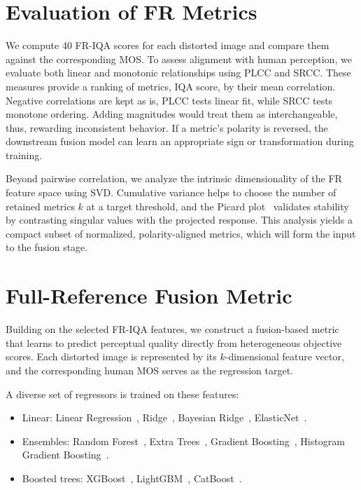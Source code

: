\section{Evaluation of \acl{FR} Metrics}

We compute 40 \acs{FR-IQA} scores for each distorted image and compare them against the corresponding \acs{MOS}. To assess alignment with human perception, we evaluate both linear and monotonic relationships using \acs{PLCC} and \acs{SRCC}. These measures provide a ranking of metrics, IQA score, by their mean correlation. Negative correlations are kept as is, \acs{PLCC} tests linear fit, while \acs{SRCC} tests monotone ordering. Adding magnitudes would treat them as interchangeable, thus, rewarding inconsistent behavior. If a metric's polarity is reversed, the downstream fusion model can learn an appropriate sign or transformation during training.

Beyond pairwise correlation, we analyze the intrinsic dimensionality of the \acs{FR} feature space using \acf{SVD}. Cumulative variance helps to choose the number of retained metrics $k$ at a target threshold, and the Picard plot~\cite{picard} validates stability by contrasting singular values with the projected response. This analysis yields a compact subset of normalized, polarity-aligned metrics, which will form the input to the fusion stage.

\section{Full-Reference Fusion Metric}

Building on the selected \acs{FR-IQA} features, we construct a fusion-based metric that learns to predict perceptual quality directly from heterogeneous objective scores. Each distorted image is represented by its $k$-dimensional feature vector, and the corresponding human \acs{MOS} serves as the regression target.

A diverse set of regressors is trained on these features:

\begin{itemize}
    \item Linear: Linear Regression~\cite{linearregression}, Ridge~\cite{ridgeregression}, Bayesian Ridge~\cite{bayesianridge}, ElasticNet~\cite{elasticnet}.
    \item Ensembles: Random Forest~\cite{randomforest}, Extra Trees~\cite{ensembles}, Gradient Boosting~\cite{gradboost}, Histogram Gradient Boosting~\cite{histogram}.
    \item Boosted trees: \acs{XGBoost}~\cite{xgboost}, \acs{LightGBM}~\cite{lightgbm}, \acs{CatBoost}~\cite{catboost}.
\end{itemize}

